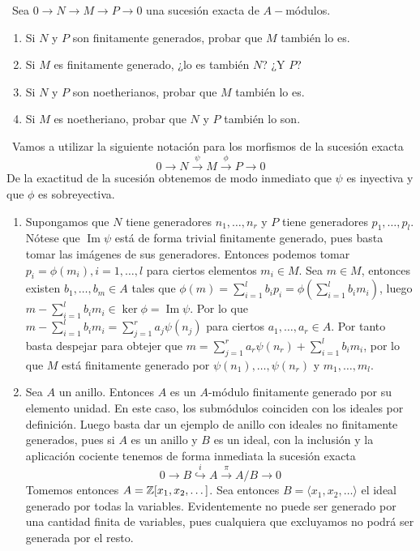 \documentclass[twoside]{article}
\DeclareMathOperator{\Ima}{Im}
\begin{document}
\begin{solucion}
\end{solucion}
\newpage
\begin{ejercicio}{3}\
Sea $0 \to N \to M \to P \to 0$ una sucesión exacta de $A-$módulos.
\begin{enumerate}
\item Si $N$ y $P$ son finitamente generados, probar que $M$ también lo es.
\item Si $M$ es finitamente generado, ¿lo es también $N$? ¿Y $P$?
\item Si $N$ y $P$ son noetherianos, probar que $M$ también lo es.
\item Si $M$ es noetheriano, probar que $N$ y $P$ también lo son.
\end{enumerate}
\end{ejercicio}
\begin{solucion}\
Vamos a utilizar la siguiente notación para los morfismos de la sucesión exacta $$0\to N  \overset{\psi}{\to} M  \overset{\phi}{\to} P \to 0$$ De la exactitud de la sucesión obtenemos de modo inmediato que $\psi$ es inyectiva y que $\phi$ es sobreyectiva. 
\begin{enumerate}
\item Supongamos que $N$ tiene generadores $n_1,\dots, n_r$ y $P$ tiene generadores $p_1,\dots, p_l$. Nótese que $\Ima\psi$ está de forma trivial finitamente generado, pues basta tomar las imágenes de sus generadores. Entonces podemos tomar $p_i=\phi(m_i), i=1,\dots, l$ para ciertos elementos $m_i\in M$. Sea $m\in M$, entonces existen $b_1,\dots, b_m\in A$ tales que $\phi(m)=\sum_{i=1}^lb_ip_i=\phi\left(\sum_{i=1}^lb_im_i\right)$, luego $m-\sum_{i=1}^lb_im_i\in\ker\phi=\Ima\psi$. Por lo que $m-\sum_{i=1}^lb_im_i=\sum_{j=1}^r a_j\psi(n_j)$ para ciertos $a_1,\dots,a_r\in A$. Por tanto basta despejar para obtejer que $m=\sum_{j=1}^r a_r\psi(n_r)+\sum_{i=1}^lb_im_i$, por lo que $M$ está finitamente generado por $\psi(n_1),\dots, \psi(n_r)$ y $m_1,\dots, m_l$.

\item Sea $A$ un anillo. Entonces $A$ es un $A$-módulo finitamente generado por su elemento unidad. En este caso, los submódulos coinciden con los ideales por definición. Luego basta dar un ejemplo de anillo con ideales no finitamente generados, pues si $A$ es un anillo y $B$ es un ideal, con la inclusión y la aplicación cociente tenemos de forma inmediata la sucesión exacta
$$0\to B \overset{i}{\hookrightarrow} A\overset{\pi}{\to} A/B\to 0$$
Tomemos entonces $A=\mathbb{Z}[x_1,x_2,\dots]$. Sea entonces $B=\langle x_1,x_2,\dots  \rangle$ el ideal generado por todas la variables. Evidentemente no puede ser generado por una cantidad finita de variables, pues cualquiera que excluyamos no podrá ser generada por el resto. 


\end{enumerate}
\end{solucion}
\end{document}
